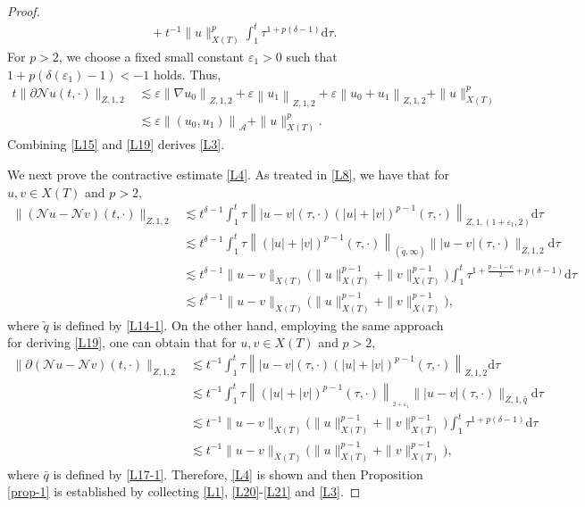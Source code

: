 \documentclass[11pt,twoside]{article}
\newcommand{\p}{\partial}
\newcommand{\ve}{\varepsilon}
\theoremstyle{plain}
\theoremstyle{definition}
\theoremstyle{remark}
\numberwithin{equation}{section}
\begin{document}
\begin{proof}
$$\begin{aligned}
&\quad+ t^{-1}\|u\|_{X(T)}^p\int_{1}^{t} \tau^{1+p(\delta-1)}\mathrm{d}\tau.
\end{aligned}
$$
For $p>2$, we choose a fixed small constant $\varepsilon_1>0$ such that $1+p(\delta(\varepsilon_1)-1)<-1$ holds.
Thus,
\begin{equation}\label{L19}
\begin{aligned}
t \|\p \mathcal{N} u(t, \cdot)\|_{Z, 1,2} &\lesssim \ve\left\|\nabla u_0\right\|_{Z, 1,2}+\ve\left\|u_1\right\|_{Z, 1,2}
+\ve\left\|u_0+u_1\right\|_{Z, 1,2} +\|u\|_{X(T)}^p\\
&  \lesssim \ve\left\|\left(u_{0}, u_{1}\right)\right\|_{\mathcal{A}}+ \|u\|_{X(T)}^p.
\end{aligned}
\end{equation}
Combining \eqref{L15} and \eqref{L19} derives \eqref{L3}.

We next prove the contractive estimate \eqref{L4}. As treated in \eqref{L8}, we have that for $u, v\in X(T)$ and $p>2$,
\begin{equation}\label{L20}
\begin{aligned}
\|(\mathcal{N} u-\mathcal{N} v)(t, \cdot)\|_{Z, 1, 2}& \lesssim t^{\delta-1}\int_{1}^{t} \tau\left\||u-v|(\tau, \cdot)(|u|+|v|)^{p-1}(\tau, \cdot)\right\|_{Z, 1,(1+\varepsilon_1, 2)}\mathrm{d}\tau\\
& \lesssim t^{\delta-1}\int_{1}^{t} \tau \left\|(|u|+|v|)^{p-1}(\tau, \cdot)\right\|_{(\tilde{q}, \infty)}\||u-v|(\tau, \cdot)\|_{Z, 1,2}\mathrm{d}\tau\\
&\lesssim t^{\delta-1} \|u-v\|_{X(T)}\big(\|u\|_{X(T)}^{p-1}+\|v\|_{X(T)}^{p-1}\big)\int_{1}^{t} \tau^{1+\frac{p-1-\kappa}{2}+p(\delta-1)}\mathrm{d}\tau\\
&\lesssim t^{\delta-1} \|u-v\|_{X(T)}\big(\|u\|_{X(T)}^{p-1}+\|v\|_{X(T)}^{p-1}\big),
\end{aligned}
\end{equation}
where $\tilde{q}$ is defined by \eqref{L14-1}. On the other hand, employing the same approach for deriving \eqref{L19}, one can obtain that for  $u, v\in X(T)$ and $p>2$,
\begin{equation}\label{L21}
\begin{aligned}
\|\p(\mathcal{N} u-\mathcal{N} v)(t, \cdot)\|_{Z, 1, 2}&
\lesssim t^{-1}\int_{1}^{t} \tau\left\||u-v|(\tau, \cdot)(|u|+|v|)^{p-1}(\tau, \cdot)\right\|_{Z, 1,2}\mathrm{d}\tau\\
& \lesssim t^{-1}\int_{1}^{t} \tau \left\|(|u|+|v|)^{p-1}(\tau, \cdot)\right\|_{_{2+\varepsilon_1}}\||u-v|(\tau, \cdot)\|_{Z, 1, \bar{q}}\mathrm{d}\tau\\
&\lesssim t^{-1} \|u-v\|_{X(T)}\big(\|u\|_{X(T)}^{p-1}+\|v\|_{X(T)}^{p-1}\big)\int_{1}^{t} \tau^{1+p(\delta-1)}\mathrm{d}\tau\\
&\lesssim t^{-1} \|u-v\|_{X(T)}\big(\|u\|_{X(T)}^{p-1}+\|v\|_{X(T)}^{p-1}\big),
\end{aligned}
\end{equation}
where $\bar{q}$ is defined by \eqref{L17-1}.  Therefore, \eqref{L4} is shown and then Proposition \ref{prop-1}
is established by collecting \eqref{L1}, \eqref{L20}-\eqref{L21} and \eqref{L3}.

\end{proof}
\end{document}
